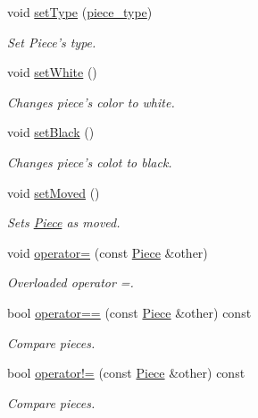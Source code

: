 \begin{DoxyCompactItemize}
void \hyperlink{classChEngn_1_1Piece_a4b66b79da54172c50072df90fae47b3e}{setType} (\hyperlink{namespaceChEngn_a2a35c185f259757a78e937575b8ed483}{piece\_\-type})
\begin{DoxyCompactList}\small\item\em Set Piece's type. \item\end{DoxyCompactList}\item 
\hypertarget{classChEngn_1_1Piece_a93b4da88b5b3bd52c025895ea9296b42}{
void \hyperlink{classChEngn_1_1Piece_a93b4da88b5b3bd52c025895ea9296b42}{setWhite} ()}
\label{classChEngn_1_1Piece_a93b4da88b5b3bd52c025895ea9296b42}

\begin{DoxyCompactList}\small\item\em Changes piece's color to white. \item\end{DoxyCompactList}\item 
\hypertarget{classChEngn_1_1Piece_a28f4d2b27bebe4cf45a9a44aeaaf1f93}{
void \hyperlink{classChEngn_1_1Piece_a28f4d2b27bebe4cf45a9a44aeaaf1f93}{setBlack} ()}
\label{classChEngn_1_1Piece_a28f4d2b27bebe4cf45a9a44aeaaf1f93}

\begin{DoxyCompactList}\small\item\em Changes piece's colot to black. \item\end{DoxyCompactList}\item 
void \hyperlink{classChEngn_1_1Piece_a49e68ef199415d60ea2a394501a52f5a}{setMoved} ()
\begin{DoxyCompactList}\small\item\em Sets \hyperlink{classChEngn_1_1Piece}{Piece} as moved. \item\end{DoxyCompactList}\item 
void \hyperlink{classChEngn_1_1Piece_a8142dd8313cf7ea1ded23af47fc45532}{operator=} (const \hyperlink{classChEngn_1_1Piece}{Piece} \&other)
\begin{DoxyCompactList}\small\item\em Overloaded operator =. \item\end{DoxyCompactList}\item 
bool \hyperlink{classChEngn_1_1Piece_a6b6b6e455671ac4f3f9996ef31602a13}{operator==} (const \hyperlink{classChEngn_1_1Piece}{Piece} \&other) const 
\begin{DoxyCompactList}\small\item\em Compare pieces. \item\end{DoxyCompactList}\item 
bool \hyperlink{classChEngn_1_1Piece_a05d046bcdb5a94a69ea0a7f335c1a7f6}{operator!=} (const \hyperlink{classChEngn_1_1Piece}{Piece} \&other) const 
\begin{DoxyCompactList}\small\item\em Compare pieces. \item\end{DoxyCompactList}\end{DoxyCompactItemize}
